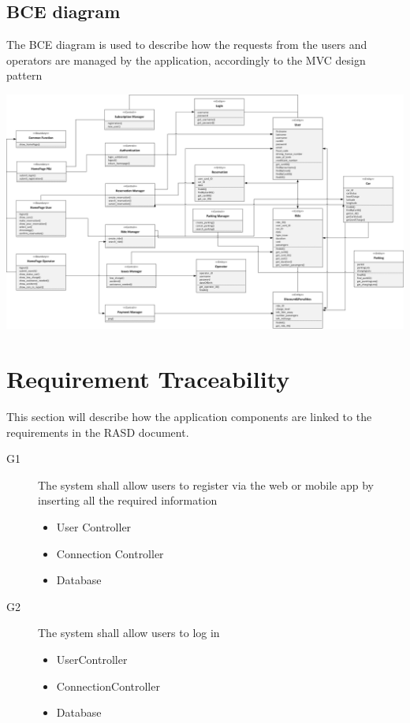 \documentclass{article}
\begin{document}
\begin{flushleft}
\subsection{BCE diagram}
The BCE diagram is used to describe how the requests from the users and operators are managed by the application, accordingly to the MVC design pattern

\vspace{1cm}
\includegraphics[scale=0.3]{FinalBCE} 
\vspace{1cm}
\newpage


\section{Requirement Traceability} %
This section will describe how the application components are linked to the requirements in the RASD document.
\begin{description}


\item [G1] The system shall allow users to register via the web or mobile app by inserting all the required information
\begin{itemize}
\item User Controller
\item Connection Controller
\item Database
\end{itemize}
\item [G2] The system shall allow users to log in
\begin{itemize}
\item UserController
\item ConnectionController
\item Database
\end{itemize}



\end{description}
\end{flushleft}
\end{document}

